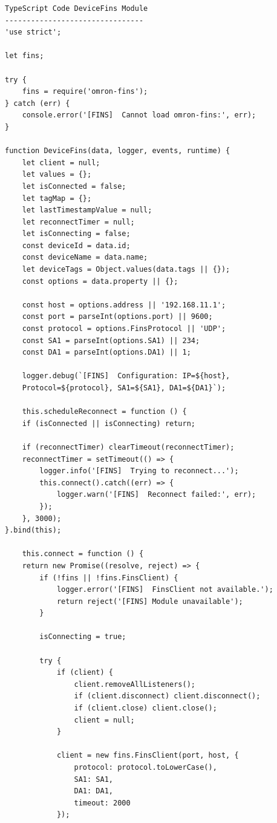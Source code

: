 \label{lampiran:kode-fins-backend}
\begin{verbatim}
TypeScript Code DeviceFins Module
--------------------------------
'use strict';

let fins;

try {
    fins = require('omron-fins');
} catch (err) {
    console.error('[FINS]  Cannot load omron-fins:', err);
}

function DeviceFins(data, logger, events, runtime) {
    let client = null;
    let values = {};
    let isConnected = false;
    let tagMap = {};
    let lastTimestampValue = null;
    let reconnectTimer = null;
    let isConnecting = false;
    const deviceId = data.id;
    const deviceName = data.name;
    let deviceTags = Object.values(data.tags || {});
    const options = data.property || {};

    const host = options.address || '192.168.11.1';
    const port = parseInt(options.port) || 9600;
    const protocol = options.FinsProtocol || 'UDP';
    const SA1 = parseInt(options.SA1) || 234;
    const DA1 = parseInt(options.DA1) || 1;

    logger.debug(`[FINS]  Configuration: IP=${host}, 
    Protocol=${protocol}, SA1=${SA1}, DA1=${DA1}`);

    this.scheduleReconnect = function () {
    if (isConnected || isConnecting) return;

    if (reconnectTimer) clearTimeout(reconnectTimer);
    reconnectTimer = setTimeout(() => {
        logger.info('[FINS]  Trying to reconnect...');
        this.connect().catch((err) => {
            logger.warn('[FINS]  Reconnect failed:', err);
        });
    }, 3000);
}.bind(this);

    this.connect = function () {
    return new Promise((resolve, reject) => {
        if (!fins || !fins.FinsClient) {
            logger.error('[FINS]  FinsClient not available.');
            return reject('[FINS] Module unavailable');
        }

        isConnecting = true;

        try {
            if (client) {
                client.removeAllListeners();
                if (client.disconnect) client.disconnect();
                if (client.close) client.close();
                client = null;
            }

            client = new fins.FinsClient(port, host, {
                protocol: protocol.toLowerCase(),
                SA1: SA1,
                DA1: DA1,
                timeout: 2000
            });


\end{verbatim}
